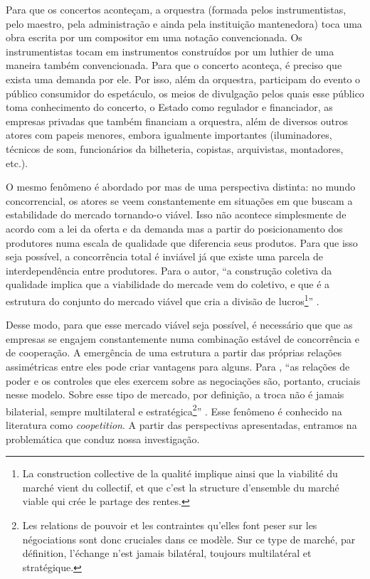 \documentclass[a4paper, 12pt, openright, oneside, german, french, english, brazil]{abntex2}
\begin{document}
	Para que os concertos aconteçam, a orquestra (formada pelos instrumentistas, pelo maestro, pela administração e ainda pela instituição mantenedora) toca uma obra escrita por um compositor em uma notação convencionada. Os instrumentistas tocam em instrumentos construídos por um luthier de uma maneira também convencionada. Para que o concerto aconteça, é preciso que exista uma demanda por ele. Por isso, além da orquestra, participam do evento o público consumidor do espetáculo, os meios de divulgação pelos quais esse público toma conhecimento do concerto, o Estado como regulador e financiador, as empresas privadas que também financiam a orquestra, além de diversos outros atores com papeis menores, embora igualmente importantes (iluminadores, técnicos de som, funcionários da bilheteria, copistas, arquivistas, montadores, etc.).
	
	O mesmo fenômeno é abordado por  mas de uma perspectiva distinta: no mundo concorrencial, os atores se veem constantemente em situações em que buscam a estabilidade do mercado tornando-o viável. Isso não acontece simplesmente de acordo com a lei da oferta e da demanda mas a partir do posicionamento dos produtores numa escala de qualidade que diferencia seus produtos. Para que isso seja possível, a concorrência total é inviável já que existe uma parcela de interdependência entre produtores. Para o autor, ``a construção coletiva da qualidade implica que a viabilidade do mercade vem do coletivo, e que é a estrutura do conjunto do mercado viável que cria a divisão de lucros\footnote{La construction collective de la qualité implique ainsi que la viabilité du marché vient du collectif, et que c'est la structure d'ensemble du marché viable qui crée le partage des rentes.}'' \cite[p. 563, tradução do autor]{lazega2009theorie}. 
	
	Desse modo, para que esse mercado viável seja possível, é necessário que que as empresas se engajem constantemente numa combinação estável de concorrência e de cooperação. A emergência de uma estrutura a partir das próprias relações assimétricas entre eles pode criar vantagens para alguns. Para , ``as relações de poder e os controles que eles exercem sobre as negociações são, portanto, cruciais nesse modelo. Sobre esse tipo de mercado, por definição, a troca não é jamais bilaterial, sempre multilateral e estratégica\footnote{Les relations de pouvoir et les contraintes qu'elles font peser sur les négociations sont donc cruciales dans ce modèle. Sur ce type de marché, par définition, l'échange n'est jamais bilatéral, toujours multilatéral et stratégique.}'' \cite[p. 563, tradução do autor]{lazega2009theorie}. Esse fenômeno é conhecido na literatura como \textit{coopetition}. A partir das perspectivas apresentadas, entramos na problemática que conduz nossa investigação.
	
\end{document}
